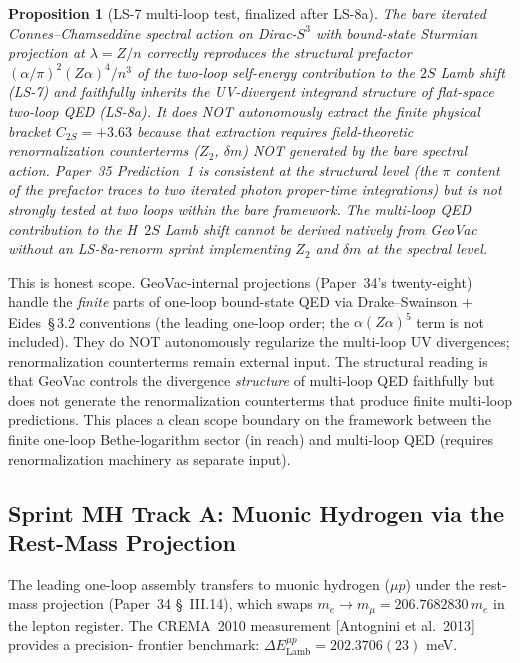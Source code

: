\documentclass[11pt]{article}
\newtheorem{proposition}{Proposition}
\begin{document}
\begin{proposition}[LS-7 multi-loop test, finalized after LS-8a]
\label{prop:ls7_finalized}
The bare iterated Connes--Chamseddine spectral action on Dirac-$S^3$
with bound-state Sturmian projection at $\lambda = Z/n$ correctly
reproduces the structural prefactor $(\alpha/\pi)^2 (Z\alpha)^4 / n^3$
of the two-loop self-energy contribution to the $2S$ Lamb shift
(LS-7) and faithfully inherits the UV-divergent integrand structure
of flat-space two-loop QED (LS-8a).  It does NOT autonomously
extract the finite physical bracket $C_{2S} = +3.63$ because that
extraction requires field-theoretic renormalization counterterms
($Z_2$, $\delta m$) NOT generated by the bare spectral action.
Paper~35 Prediction~1 is consistent at the structural level
(the $\pi$ content of the prefactor traces to two iterated
photon proper-time integrations) but is not strongly tested at
two loops within the bare framework.  The multi-loop QED contribution
to the H~$2S$ Lamb shift cannot be derived natively from GeoVac without
an LS-8a-renorm sprint implementing $Z_2$ and $\delta m$ at the
spectral level.
\end{proposition}

This is honest scope.  GeoVac-internal projections (Paper~34's
twenty-eight) handle the \emph{finite} parts of one-loop bound-state QED
via Drake--Swainson + Eides~\S\,3.2 conventions (the leading one-loop
order; the $\alpha(Z\alpha)^5$ term is not included).  They do NOT autonomously regularize the multi-loop
UV divergences; renormalization counterterms remain external input.
The structural reading is that GeoVac controls the divergence
\emph{structure} of multi-loop QED faithfully but does not generate
the renormalization counterterms that produce finite multi-loop
predictions.  This places a clean scope boundary on the framework
between the finite one-loop Bethe-logarithm sector (in reach) and
multi-loop QED (requires renormalization machinery as separate
input).

\subsection{Sprint MH Track A: Muonic Hydrogen via the Rest-Mass
Projection}
\label{sec:sprint_mh_track_a}

The leading one-loop assembly transfers to muonic hydrogen ($\mu p$) under the
rest-mass projection (Paper~34 \S~III.14), which swaps
$m_e \to m_\mu = 206.7682830\, m_e$ in the lepton register.  The
CREMA~2010 measurement [Antognini et al.\ 2013] provides a precision-
frontier benchmark: $\Delta E^{\mu p}_\text{Lamb} = 202.3706(23)$ meV.
\end{document}
